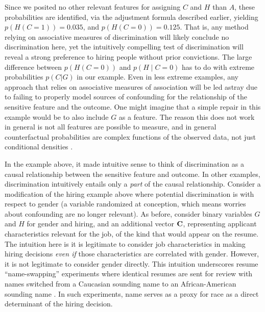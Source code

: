 \documentclass[letterpaper]{article} %
\newcommand{\citep}{\cite}
\begin{document}
Since we posited no other relevant features for assigning $C$ and $H$ than $A$, these probabilities are identified, via the adjustment formula described earlier, yielding $p(H(C=1)) = 0.035$, and $p(H(C=0)) = 0.125$.  That is, any method relying on associative measures of discrimination will likely conclude no discrimination here, yet the intuitively compelling test of discrimination will reveal a strong preference to hiring people without prior convictions.
The large difference between $p(H(C=0))$ and $p(H \mid C=0)$ has to do with extreme probabilities $p(C|G)$ in our example.
Even in less extreme examples, any approach that relies on associative measures of association will be led astray due to failing to properly model sources of confounding for the relationship of the sensitive feature and the outcome.
One might imagine that a simple repair in this example would be to also include $G$ as a feature.  The reason this does not work in general is not all features are possible to measure, and in general counterfactual probabilities are complex functions of the observed data, not just conditional densities \citep{shpitser06id}.

In the example above, it made intuitive sense to think of discrimination as a causal relationship between the sensitive feature and outcome.
In other examples, discrimination intuitively entails only a \emph{part} of the causal relationship.  Consider a modification of the hiring example above where potential discrimination is with respect to gender (a variable randomized at conception, which means worries about confounding are no longer relevant).  As before, consider binary variables $G$ and $H$ for gender and hiring, and an additional vector ${\bf C}$, representing applicant characteristics relevant for the job, of the kind that would appear on the resume.  The intuition here is it is legitimate to consider job characteristics in making hiring decisions \emph{even if} those characteristics are correlated with gender.  However, it is not legitimate to consider gender directly.  This intuition underscores resume ``name-swapping'' experiments where identical resumes are sent for review with names switched from a Caucasian sounding name to an African-American sounding name \citep{Bertrand2004}.  In such experiments, name serves as a proxy for race as a direct determinant of the hiring decision.
\end{document}
